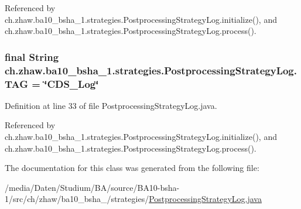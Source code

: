 Referenced by ch.zhaw.ba10\_\-bsha\_\-1.strategies.PostprocessingStrategyLog.initialize(), and ch.zhaw.ba10\_\-bsha\_\-1.strategies.PostprocessingStrategyLog.process().\hypertarget{classch_1_1zhaw_1_1ba10__bsha__1_1_1strategies_1_1PostprocessingStrategyLog_a6df45194bbb46859b3418869f3e2daa0}{
\subsubsection[{TAG}]{\setlength{\rightskip}{0pt plus 5cm}final String {\bf ch.zhaw.ba10\_\-bsha\_\-1.strategies.PostprocessingStrategyLog.TAG} = \char`\"{}CDS\_\-Log\char`\"{}}}
\label{classch_1_1zhaw_1_1ba10__bsha__1_1_1strategies_1_1PostprocessingStrategyLog_a6df45194bbb46859b3418869f3e2daa0}


Definition at line 33 of file PostprocessingStrategyLog.java.

Referenced by ch.zhaw.ba10\_\-bsha\_\-1.strategies.PostprocessingStrategyLog.initialize(), and ch.zhaw.ba10\_\-bsha\_\-1.strategies.PostprocessingStrategyLog.process().

The documentation for this class was generated from the following file:\begin{DoxyCompactItemize}
\item 
/media/Daten/Studium/BA/source/BA10-\/bsha-\/1/src/ch/zhaw/ba10\_\-bsha\_/strategies/\hyperlink{PostprocessingStrategyLog_8java}{PostprocessingStrategyLog.java}\end{DoxyCompactItemize}
